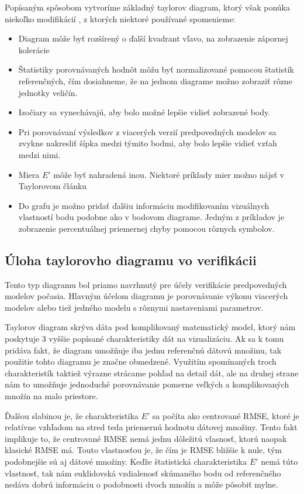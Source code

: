 Popísaným spôsobom vytvoríme základný taylorov diagram, ktorý však ponúka niekoľko modifikácií \cite{TaylorPrime}, z ktorých niektoré používané spomenieme:

\begin{singlespacing}
\begin{itemize} 
	\item Diagram môže byť rozšírený o ďalší kvadrant vľavo, na zobrazenie zápornej kolerácie 
	\item Štatistiky porovnávaných hodnôt môžu byť normalizované pomocou štatistík referenčných, čím dosiahneme, že na jednom diagrame možno zobraziť rôzne jednotky veličín.
	\item Izočiary sa vynechávajú, aby bolo možné lepšie vidieť zobrazené body.
	\item Pri porovnávaní výsledkov z viacerých verzií predpovedných modelov sa zvykne nakresliť šípka medzi týmito bodmi, aby bolo lepšie vidieť vzťah medzi nimi.
	\item Miera $ E' $ môže byť nahradená inou. Niektoré príklady mier možno nájsť v Taylorovom článku \cite{Taylor}
	\item Do grafu je možno pridať ďalšiu informáciu modifikovaním vizuálnych vlastností bodu podobne ako v bodovom diagrame. Jedným z príkladov je zobrazenie percentuálnej priemernej chyby pomocou rôznych symbolov.
\end{itemize}
\end{singlespacing}



\subsection{Úloha taylorovho diagramu vo verifikácii}
Tento typ diagramu bol priamo navrhnutý pre účely verifikácie predpovedných modelov počasia. Hlavným účelom diagramu je porovnávanie výkonu viacerých modelov alebo tiež jedného modelu s rôznymi nastaveniami parametrov. 

Taylorov diagram skrýva dáta pod komplikovaný matematický model, ktorý nám poskytuje 3 vyššie popísané charakteristiky dát na vizualizáciu. Ak sa k tomu pridáva fakt, že diagram umožňuje iba jednu referenčnú dátovú množinu, tak použitie tohto diagramu je značne obmedzené. Využitím spomínaných troch charakteristík taktiež výrazne strácame pohľad na detail dát, ale na druhej strane nám to umožňuje jednoduché porovnávanie pomerne veľkých a komplikovaných množín na malo priestore. 

Ďalšou slabinou je, že charakteristika $ E' $ sa počíta ako centrované RMSE, ktoré je relatívne vzhľadom na stred teda priemernú hodnotu dátovej množiny. Tento fakt implikuje to, že centrované RMSE nemá jednu dôležitú vlasnosť, ktorú naopak klasické RMSE má. Touto vlastnosťou je, že čím je RMSE bližšie k nule, tým podobnejšie sú aj dátové množiny. Keďže štatistická charakteristika $ E' $ nemá túto vlastnosť, tak nám euklidovská vzdialenosť skúmaného bodu od referenčného nedáva dobrú informáciu o podobnosti dvoch množín a môže pôsobiť mylne.